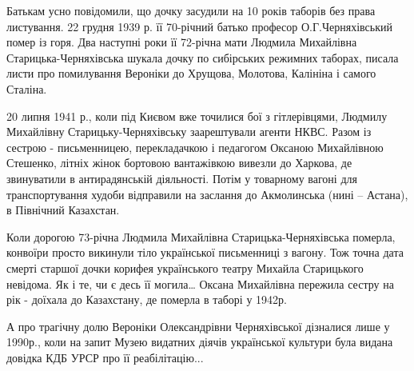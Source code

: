 Батькам усно повідомили, що дочку засудили на 10 років таборів без права
листування. 22 грудня 1939 р. її 70-річний батько професор О.Г.Черняхівський
помер із горя. Два наступні роки її 72-річна мати Людмила Михайлівна
Старицька-Черняхівська шукала дочку по сибірських режимних таборах, писала
листи про помилування Вероніки до Хрущова, Молотова, Калініна і самого Сталіна.

20 липня 1941 р., коли під Києвом вже точилися бої з гітлерівцями, Людмилу
Михайлівну Старицьку-Черняхівську заарештували агенти НКВС. Разом із сестрою -
письменницею, перекладачкою і педагогом Оксаною Михайлівною Стешенко, літніх
жінок бортовою вантажівкою вивезли до Харкова, де звинуватили в антирадянській
діяльності. Потім у товарному вагоні для транспортування худоби відправили на
заслання до Акмолинська (нині – Астана), в Північний Казахстан.

Коли дорогою 73-річна Людмила Михайлівна Старицька-Черняхівська померла,
конвоїри просто викинули тіло української письменниці з вагону. Тож точна
дата смерті старшої дочки корифея українського театру Михайла Старицького
невідома. Як і те, чи є десь її могила… Оксана Михайлівна пережила сестру на
рік - доїхала до Казахстану, де померла в таборі у 1942р.

А про трагічну долю Вероніки Олександрівни Черняхівської дізналися лише у
1990р., коли на запит Музею видатних діячів української культури була видана
довідка КДБ УРСР про її реабілітацію...
